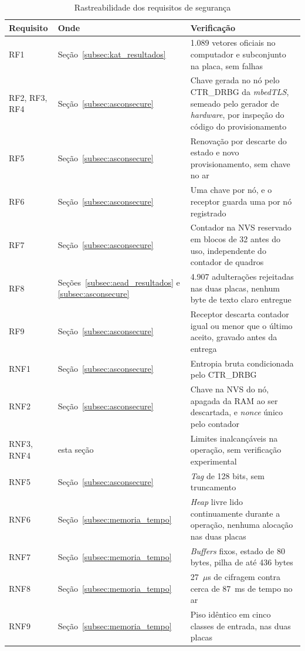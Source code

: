 \begin{table}[htb]
\centering
\caption{Rastreabilidade dos requisitos de segurança}
\label{tab:rastreabilidade_ascon}
\small
\begin{tabular}{lp{}p{}}
\hline
\textbf{Requisito} & \textbf{Onde} & \textbf{Verificação} \\
\hline
RF1 & Seção~\ref{subsec:kat_resultados} & 1.089 vetores oficiais no computador e subconjunto na placa, sem falhas \\
RF2, RF3, RF4 & Seção~\ref{subsec:asconsecure} & Chave gerada no nó pelo CTR\_DRBG da \textit{mbedTLS}, semeado pelo gerador de \textit{hardware}, por inspeção do código do provisionamento \\
RF5 & Seção~\ref{subsec:asconsecure} & Renovação por descarte do estado e novo provisionamento, sem chave no ar \\
RF6 & Seção~\ref{subsec:asconsecure} & Uma chave por nó, e o receptor guarda uma por nó registrado \\
RF7 & Seção~\ref{subsec:asconsecure} & Contador na NVS reservado em blocos de 32 antes do uso, independente do contador de quadros \\
RF8 & Seções~\ref{subsec:aead_resultados} e \ref{subsec:asconsecure} & 4.907 adulterações rejeitadas nas duas placas, nenhum byte de texto claro entregue \\
RF9 & Seção~\ref{subsec:asconsecure} & Receptor descarta contador igual ou menor que o último aceito, gravado antes da entrega \\
RNF1 & Seção~\ref{subsec:asconsecure} & Entropia bruta condicionada pelo CTR\_DRBG \\
RNF2 & Seção~\ref{subsec:asconsecure} & Chave na NVS do nó, apagada da RAM ao ser descartada, e \textit{nonce} único pelo contador \\
RNF3, RNF4 & esta seção & Limites inalcançáveis na operação, sem verificação experimental \\
RNF5 & Seção~\ref{subsec:asconsecure} & \textit{Tag} de 128 bits, sem truncamento \\
RNF6 & Seção~\ref{subsec:memoria_tempo} & \textit{Heap} livre lido continuamente durante a operação, nenhuma alocação nas duas placas \\
RNF7 & Seção~\ref{subsec:memoria_tempo} & \textit{Buffers} fixos, estado de 80 bytes, pilha de até 436 bytes \\
RNF8 & Seção~\ref{subsec:memoria_tempo} & 27~$\mu$s de cifragem contra cerca de 87~ms de tempo no ar \\
RNF9 & Seção~\ref{subsec:memoria_tempo} & Piso idêntico em cinco classes de entrada, nas duas placas \\
\hline
\end{tabular}
\end{table}
